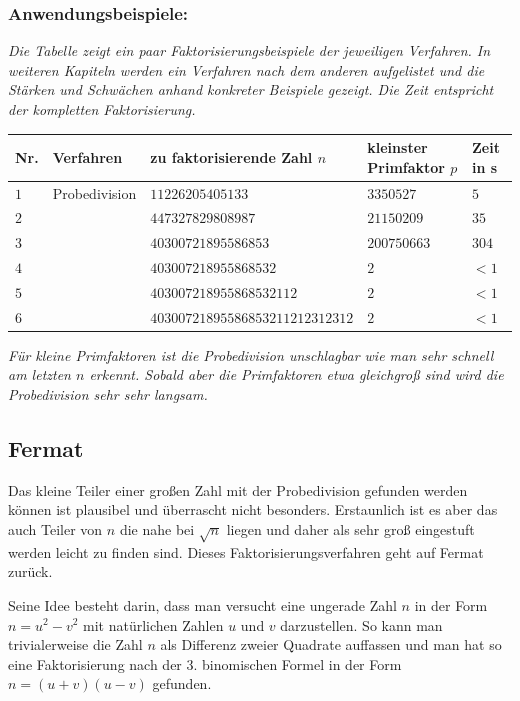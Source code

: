 \documentclass[a4paper,11pt]{article}
\begin{document}
\subsubsection*{Anwendungsbeispiele:}
{\it
Die Tabelle zeigt ein paar Faktorisierungsbeispiele der jeweiligen Verfahren. In weiteren
Kapiteln werden ein Verfahren nach dem anderen aufgelistet und die Stärken und Schwächen
anhand konkreter Beispiele gezeigt. Die Zeit entspricht der kompletten Faktorisierung.
}
\begin{center}
\begin{tabular}{|l|l|l|l|l|}
\hline
Nr. & Verfahren & zu faktorisierende Zahl $n$ & kleinster Primfaktor $p$ & Zeit in s\\
\hline
$1$& Probedivision & $11226205405133$ & $3350527$ & $5$\\
$2$&	& $447327829808987$ & $21150209$ & $35$\\
$3$&	& $40300721895586853$  & $200750663$ & $304$\\
$4$&	& $403007218955868532$ & $2$ & $<1$\\
$5$&	& $403007218955868532112$ & $2$ & $<1$\\
$6$&	& $40300721895586853211212312312$ & $2$ & $<1$\\
\hline
\end{tabular}
\end{center}
{\it
Für kleine Primfaktoren ist die Probedivision unschlagbar wie man sehr
schnell am letzten $n$ erkennt. Sobald aber die Primfaktoren
etwa gleichgroß sind wird die Probedivision sehr sehr langsam.
}
\subsection{Fermat}
Das kleine Teiler einer großen Zahl mit der Probedivision gefunden werden können
ist plausibel und überrascht nicht besonders. Erstaunlich ist es aber das auch
Teiler von $n$ die nahe bei $\sqrt{n}$ liegen und daher als sehr groß eingestuft
werden leicht zu finden sind. Dieses Faktorisierungsverfahren geht auf Fermat zurück.

Seine Idee besteht darin, dass man versucht eine ungerade Zahl $n$ in der Form
$n=u^2 - v^2$ mit natürlichen Zahlen $u$ und $v$ darzustellen. So kann man
trivialerweise die Zahl $n$ als Differenz zweier Quadrate auffassen und man hat
so eine Faktorisierung nach der 3. binomischen Formel in der Form $n=(u+v)(u-v)$
gefunden.
\end{document}
